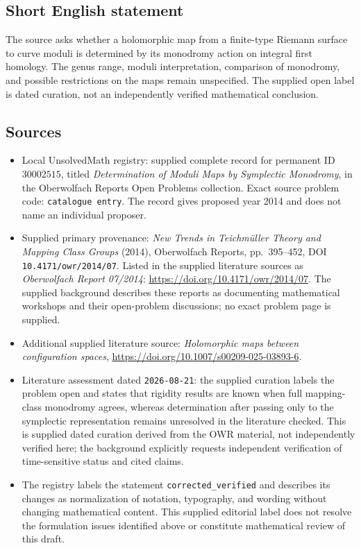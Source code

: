 \documentclass[11pt]{article}
\begin{document}
\subsection{Short English statement}
The source asks whether a holomorphic map from a finite-type Riemann surface to curve moduli is determined by its monodromy action on integral first homology. The genus range, moduli interpretation, comparison of monodromy, and possible restrictions on the maps remain unspecified. The supplied open label is dated curation, not an independently verified mathematical conclusion.
\subsection{Sources}
\begin{itemize}
\item Local UnsolvedMath registry: supplied complete record for permanent ID \(30002515\), titled \emph{Determination of Moduli Maps by Symplectic Monodromy}, in the Oberwolfach Reports Open Problems collection. Exact source problem code: \texttt{catalogue entry}. The record gives proposed year 2014 and does not name an individual proposer.
\item Supplied primary provenance: \emph{New Trends in Teichmüller Theory and Mapping Class Groups} (2014), Oberwolfach Reports, pp.~395--452, DOI \texttt{10.4171/owr/2014/07}. Listed in the supplied literature sources as \emph{Oberwolfach Report 07/2014}: \url{https://doi.org/10.4171/owr/2014/07}. The supplied background describes these reports as documenting mathematical workshops and their open-problem discussions; no exact problem page is supplied.
\item Additional supplied literature source: \emph{Holomorphic maps between configuration spaces}, \url{https://doi.org/10.1007/s00209-025-03893-6}.
\item Literature assessment dated \texttt{2026-08-21}: the supplied curation labels the problem open and states that rigidity results are known when full mapping-class monodromy agrees, whereas determination after passing only to the symplectic representation remains unresolved in the literature checked. This is supplied dated curation derived from the OWR material, not independently verified here; the background explicitly requests independent verification of time-sensitive status and cited claims.
\item The registry labels the statement \texttt{corrected\_verified} and describes its changes as normalization of notation, typography, and wording without changing mathematical content. This supplied editorial label does not resolve the formulation issues identified above or constitute mathematical review of this draft.
\end{itemize}
\end{document}
